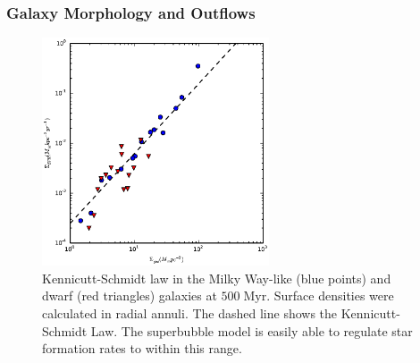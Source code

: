 \subsubsection{Galaxy Morphology and Outflows}\label{Morphology}

\begin{figure}
    \includegraphics[width=0.6\textwidth]{figures1/kennicutt_schmidt.eps}
    \caption[Kennicutt-Schmidt law for isolated galaxies]{Kennicutt-Schmidt law
    in the Milky Way-like (blue points) and dwarf (red triangles) galaxies at
    $500\;\mathrm{Myr}$. Surface densities were calculated in radial annuli.
    The dashed line shows the Kennicutt-Schmidt Law.  The superbubble model is
    easily able to regulate star formation rates to within this range.}
    \label{kennicutt_schmidt}
\end{figure}

